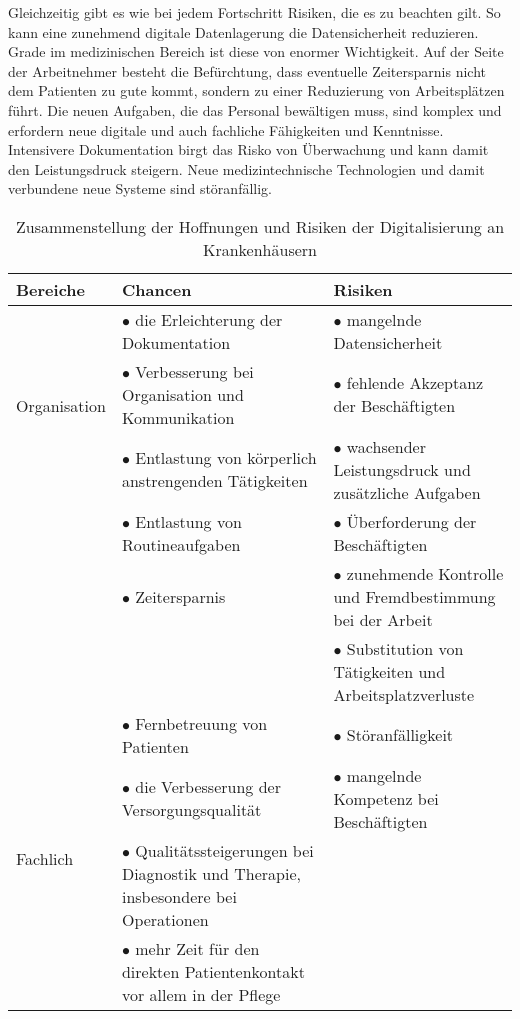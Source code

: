 Gleichzeitig gibt es wie bei jedem Fortschritt Risiken, die es zu beachten gilt. So kann eine zunehmend digitale Datenlagerung die Datensicherheit reduzieren. Grade im medizinischen Bereich ist diese von enormer Wichtigkeit. Auf der Seite der Arbeitnehmer besteht die Befürchtung, dass eventuelle Zeitersparnis nicht dem Patienten zu gute kommt, sondern zu einer Reduzierung von Arbeitsplätzen führt. Die neuen Aufgaben, die das Personal bewältigen muss, sind komplex und erfordern neue digitale und auch fachliche Fähigkeiten und Kenntnisse. Intensivere Dokumentation birgt das Risko von Überwachung und kann damit den Leistungsdruck steigern. Neue medizintechnische Technologien und damit verbundene neue Systeme sind störanfällig. \parencite{braeutigam2017}
\begin{table}[h]
	\begin{tabular}{l|p{}|p{}}
	\textbf{Bereiche}&\textbf{Chancen}&\textbf{Risiken}\\
	\hline
	\multirow{3}{*}{Organisation}
		&$\bullet$ die Erleichterung der Dokumentation &$\bullet$ mangelnde Datensicherheit\\
		&$\bullet$ Verbesserung bei Organisation und Kommunikation &$\bullet$ fehlende Akzeptanz der Beschäftigten\\
	\hline
	\multirow{7}{*}{Personal}
		&$\bullet$ Entlastung von körperlich anstrengenden Tätigkeiten &$\bullet$ wachsender Leistungsdruck und zusätzliche Aufgaben\\
		&$\bullet$ Entlastung von Routineaufgaben &$\bullet$ Überforderung der Beschäftigten\\
		&$\bullet$ Zeitersparnis&$\bullet$ zunehmende Kontrolle und Fremdbestimmung bei der Arbeit\\
		&&$\bullet$ Substitution von Tätigkeiten und Arbeitsplatzverluste\\
	\hline
	\multirow{6}{*}{Fachlich}
		&$\bullet$ Fernbetreuung von Patienten&$\bullet$ Störanfälligkeit\\
		&$\bullet$ die Verbesserung der Versorgungsqualität &$\bullet$ mangelnde Kompetenz bei Beschäftigten\\
		&$\bullet$ Qualitätssteigerungen bei Diagnostik und Therapie, insbesondere bei Operationen&\\
		&$\bullet$ mehr Zeit für den direkten Patientenkontakt vor allem in der Pflege&\\
	\end{tabular}
	\caption{Zusammenstellung der Hoffnungen und Risiken der Digitalisierung an Krankenhäusern \parencite{braeutigam2017}}
	\label{tab:hoffnung_risiken}
\end{table}
